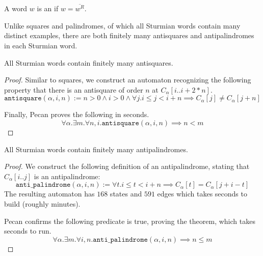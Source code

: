 \begin{definition}
    A word $w$ is an  if $w = \overline{w^R}$.
\end{definition}

Unlike squares and palindromes, of which all Sturmian words contain many distinct examples, there are both finitely many antisquares and antipalindromes in each Sturmian word.

\begin{theorem}
    All Sturmian words contain finitely many antisquares.
\end{theorem}
\begin{proof}
Similar to squares, we construct an automaton recognizing the following property that there is an antisquare of order $n$ at $C_{\alpha}[i..i+2*n]$.
\[
    \texttt{antisquare}(\alpha, i, n) := n > 0 \land i > 0 \land \forall j. i \leq j < i + n \implies C_{\alpha}[j] \ne C_{\alpha}[j + n]
\]

Finally, Pecan proves the following in  seconds.
\[
    \forall \alpha. \exists m. \forall n, i. \texttt{antisquare}(\alpha, i, n) \implies n < m
\]
\end{proof}

\begin{theorem}
    All Sturmian words contain finitely many antipalindromes.
\end{theorem}
\begin{proof}
    We construct the following definition of an antipalindrome, stating that $C_{\alpha}[i..j]$ is an antipalindrome:
    \[
        \texttt{anti\_palindrome}(\alpha, i, n) := 
            \forall t. i \leq t < i + n \implies C_{\alpha}[t] = C_{\alpha}[j + i - t]
    \]
    The resulting automaton has $168$ states and $591$ edges which takes  seconds to build (roughly  minutes).
    
    Pecan confirms the following predicate is true, proving the theorem, which takes  seconds to run.
    \[
        \forall \alpha. \exists m. \forall i, n. \texttt{anti\_palindrome}(\alpha, i, n) \implies n \leq m
    \]
\end{proof}


